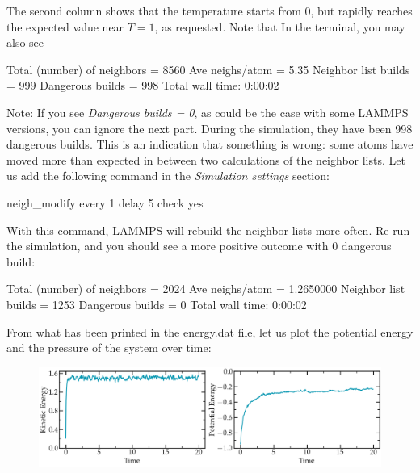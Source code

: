 \noindent The second column shows that the temperature
starts from 0, but rapidly reaches the
expected value near $T=1$, as requested. 
Note that  In the terminal, you may also see

\begin{lcverbatim}
Total (number) of neighbors = 8560
Ave neighs/atom = 5.35
Neighbor list builds = 999
Dangerous builds = 998
Total wall time: 0:00:02
\end{lcverbatim}

\noindent Note: If you see \textit{Dangerous builds = 0}, as could be
the case with some LAMMPS versions, you can ignore
the next part.
During the simulation, they have been 998 dangerous builds.
This is an indication that something is wrong: some atoms
have moved more than expected in between two calculations of
the neighbor lists. Let us add the following command in the
\textit{Simulation settings} section:

\begin{lcverbatim}
neigh_modify every 1 delay 5 check yes
\end{lcverbatim}

\noindent With this command, LAMMPS will rebuild the neighbor lists
more often. Re-run the simulation, and you should see a more
positive outcome with 0 dangerous build:

\begin{lcverbatim}
Total (number) of neighbors = 2024
Ave neighs/atom = 1.2650000
Neighbor list builds = 1253
Dangerous builds = 0
Total wall time: 0:00:02
\end{lcverbatim}

\noindent From what has been printed in the energy.dat file, let us
plot the potential energy and the pressure of
the system over time:

\begin{figure}
\includegraphics[width=\linewidth]{tutorials/level0/lennard-jones-fluid/energy-light.png}
\end{figure}

